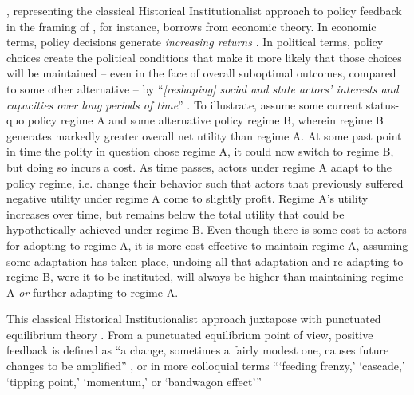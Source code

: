 \documentclass[11pt]{article}
\begin{document}
\textcite{Pierson2000}, representing the classical Historical Institutionalist approach to policy feedback in the framing of \textcite{Jacobs2014}, for instance, borrows from economic theory. In economic terms, policy decisions generate \textit{increasing returns} \parencites[for economic discussion see][]{Arthur1994}[for application to instittional development see][]{Krasner1988}. In political terms, policy choices create the political conditions that make it more likely that those choices will be maintained -- even in the face of overall suboptimal outcomes, compared to some other alternative -- by \enquote{\textit{[reshaping] social and state actors' interests and capacities over long periods of time}} \parencite[][p. 443, original emphasis]{Jacobs2014}. To illustrate, assume some current status-quo policy regime A and some alternative policy regime B, wherein regime B generates markedly greater overall net utility than regime A. At some past point in time the polity in question chose regime A, it could now switch to regime B, but doing so incurs a cost. As time passes, actors under regime A adapt to the policy regime, i.e. change their behavior such that actors that previously suffered negative utility under regime A come to slightly profit. Regime A's utility increases over time, but remains below the total utility that could be hypothetically achieved under regime B. Even though there is some cost to actors for adopting to regime A, it is more cost-effective to maintain regime A, assuming some adaptation has taken place, undoing all that adaptation and re-adapting to regime B, were it to be instituted, will always be higher than maintaining regime A \textit{or} further adapting to regime A. 

This classical Historical Institutionalist approach \textcite{Jacobs2014} juxtapose with punctuated equilibrium theory \parencites{Baumgartner2009}{Baumgartner2002}. From a punctuated equilibrium point of view, positive feedback is defined as \enquote{a change, sometimes a fairly modest one, causes future changes to be amplified} \parencite[p. 61]{Baumgartner2018}, or in more colloquial terms \enquote{\enquote{feeding frenzy,} \enquote{cascade,} \enquote{tipping point,} \enquote{momentum,} or \enquote{bandwagon effect}} 
\end{document}
